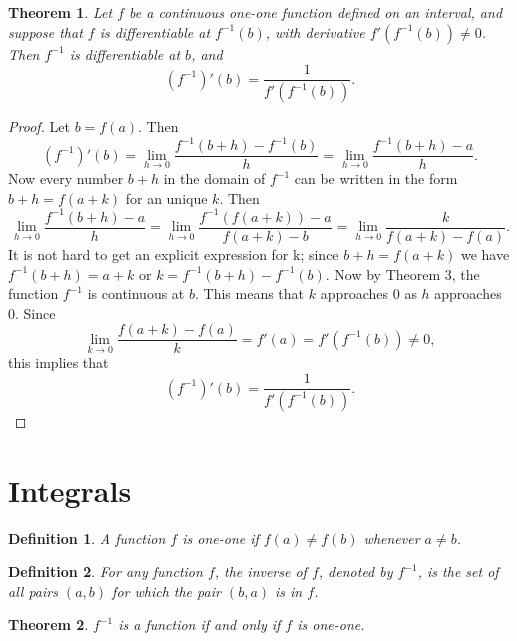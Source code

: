 \documentclass{article}
\numberwithin{corollary}{subsection}
\newtheorem{definition}{Definition}
\numberwithin{definition}{subsection}
\numberwithin{lemma}{subsection}
\newtheorem{theorem}{Theorem}
\numberwithin{theorem}{subsection}
\begin{document}
\begin{theorem}
  Let $f$ be a continuous one-one function defined on an interval, and suppose
  that $f$ is differentiable at $f^{-1}(b)$, with derivative $f'(f^{-1}(b))
  \neq 0$. Then $f^{-1}$ is differentiable at $b$, and \[
    (f^{-1})'(b) = \frac{1}{f'(f^{-1}(b))}.
  \]
\end{theorem}
\begin{proof}
  Let $b = f(a)$. Then \[
    (f^{-1})'(b)
    = \lim_{h \to 0} \frac{f^{-1}(b + h) - f^{-1}(b)}{h}
    = \lim_{h \to 0} \frac{f^{-1}(b + h) - a}{h}.
  \] Now every number $b + h$ in the domain of $f^{-1}$ can be written in the
  form $b + h = f(a + k)$ for an unique $k$. Then \[
    \lim_{h \to 0} \frac{f^{-1}(b + h) - a}{h}
    = \lim_{h \to 0} \frac{f^{-1}(f(a + k)) - a}{f(a + k) - b}
    = \lim_{h \to 0} \frac{k}{f(a + k) - f(a)}.
  \] It is not hard to get an explicit expression for k; since $b + h =
  f(a + k)$ we have $f^{-1}(b + h) = a + k$ or $k = f^{-1}(b + h) - f^{-1}(b)$.
  Now by Theorem 3, the function $f^{-1}$ is continuous at $b$. This means that
  $k$ approaches 0 as $h$ approaches 0. Since \[
    \lim_{k \to 0} \frac{f(a + k) - f(a)}{k} = f'(a) = f'(f^{-1}(b)) \neq 0,
  \] this implies that \[
    (f^{-1})'(b) = \frac{1}{f'(f^{-1}(b))}.
  \]
\end{proof}

\section{Integrals}

\begin{definition}
  A function $f$ is \emph{one-one} if $f(a) \neq f(b)$ whenever $a \neq b$.
\end{definition}

\begin{definition}
  For any function $f$, the \emph{inverse} of $f$, denoted by $f^{-1}$, is the
  set of all pairs $(a, b)$ for which the pair $(b, a)$ is in $f$.
\end{definition}

\begin{theorem}
  $f^{-1}$ is a function if and only if $f$ is one-one.
\end{theorem}
\end{document}
